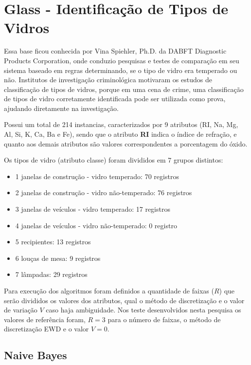 \section{Glass - Identificação de Tipos de Vidros}\label{cap:resultados:ssec:iris}

Essa base ficou conhecida por Vina Spiehler, Ph.D. da DABFT Diagnostic Products Corporation, onde conduzio pesquisas e testes de comparação em seu sistema baseado em regras determinando, se o tipo de vidro era temperado ou não. Institutos de investigação criminológica motivaram os estudos de classificação de tipos de vidros, porque em uma cena de crime, uma classificação de tipos de vidro corretamente identificada pode ser utilizada como prova, ajudando diretamente na investigação.

Possui um total de 214 instancias, caracterizados por 9 atributos (RI, Na, Mg, Al, Si, K, Ca, Ba e Fe), sendo que o atributo \textbf{RI} indica o índice de refração, e quanto aos demais atributos são valores correspondentes a porcentagem do óxido.

Os tipos de vidro (atributo classe) foram divididos em 7 grupos distintos:
\begin{itemize}
 \item 1 janelas de construção - vidro temperado: 70 registros
 \item 2 janelas de construção - vidro não-temperado: 76 registros
 \item 3 janelas de veículos - vidro temperado: 17 registros
 \item 4 janelas de veículos - vidro não-temperado: 0 registro
 \item 5 recipientes: 13 registros
 \item 6 louças de mesa: 9 registros
 \item 7 lâmpadas: 29 registros 
\end{itemize}

Para execução dos algoritmos foram definidos a quantidade de faixas (${R}$) que serão divididos os valores dos atributos, qual o método de discretização e o valor de variação ${V}$ caso haja ambiguidade. Nos teste desenvolvidos nesta pesquisa os valores de referência foram, ${R=3}$ para o número de faixas, o método de discretização EWD e o valor  ${V=0}$.


\subsection{Naive Bayes} \label{cap:resultados:ssec:glass:nb}

